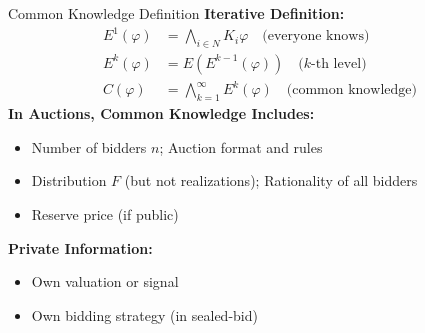 \documentclass[xcolor={x11names}, aspectratio=169 ]{beamer}
\begin{document}
\begin{frame}{Common Knowledge Definition}
\textbf{Iterative Definition:}
\vspace{-0.2cm}
\begin{align*}
E^1(\varphi) &= \bigwedge_{i \in N} K_i \varphi \quad \text{(everyone knows)} \\
E^k(\varphi) &= E(E^{k-1}(\varphi)) \quad \text{($k$-th level)} \\
C(\varphi) &= \bigwedge_{k=1}^{\infty} E^k(\varphi) \quad \text{(common knowledge)}
\end{align*}
\vspace{-0.3cm}
\textbf{In Auctions, Common Knowledge Includes:}
\begin{itemize}
  \item Number of bidders $n$; Auction format and rules
  \item Distribution $F$ (but not realizations); Rationality of all bidders
  \item Reserve price (if public)
\end{itemize}

\textbf{Private Information:}
\begin{itemize}
  \item Own valuation or signal
  \item Own bidding strategy (in sealed-bid)
\end{itemize}
\end{frame}
\end{document}
